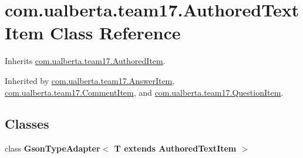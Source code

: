 \hypertarget{classcom_1_1ualberta_1_1team17_1_1_authored_text_item}{\section{com.\+ualberta.\+team17.\+Authored\+Text\+Item Class Reference}
\label{classcom_1_1ualberta_1_1team17_1_1_authored_text_item}
}


Inherits \hyperlink{classcom_1_1ualberta_1_1team17_1_1_authored_item}{com.\+ualberta.\+team17.\+Authored\+Item}.



Inherited by \hyperlink{classcom_1_1ualberta_1_1team17_1_1_answer_item}{com.\+ualberta.\+team17.\+Answer\+Item}, \hyperlink{classcom_1_1ualberta_1_1team17_1_1_comment_item}{com.\+ualberta.\+team17.\+Comment\+Item}, and \hyperlink{classcom_1_1ualberta_1_1team17_1_1_question_item}{com.\+ualberta.\+team17.\+Question\+Item}.

\subsection*{Classes}
\begin{DoxyCompactItemize}
\item 
class {\bfseries Gson\+Type\+Adapter$<$ T extends Authored\+Text\+Item $>$}
\end{DoxyCompactItemize}
